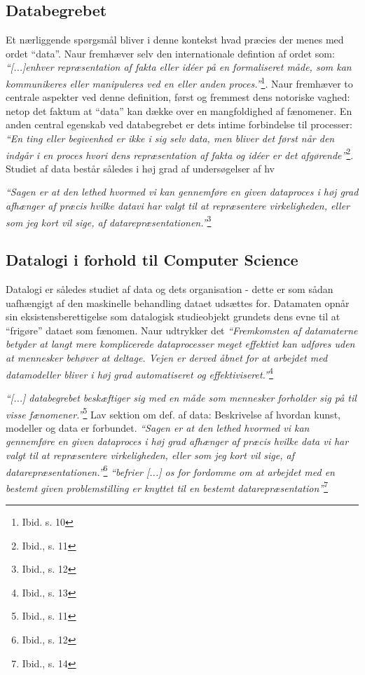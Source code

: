 \documentclass[10pt,a4paper]{article}
\newcommand{\citat}[2]{\vspace{0.1cm}\newline\textit{``#1''}\hspace{0.1cm}\footnote{#2}\vspace{0.1cm}\newline}
\begin{document}
\subsection{Databegrebet}
Et nærliggende spørgsmål bliver i denne kontekst hvad præcies der menes med
ordet ``data''. Naur fremhæver selv den internationale defintion af ordet som:
\citat{[...]enhver repræsentation af fakta eller idéer på en formaliseret måde, som
kan kommunikeres eller manipuleres ved en eller anden proces.}{Ibid. s. 10}.
Naur fremhæver to centrale aspekter ved denne definition, først og fremmest
dens notoriske vaghed: netop det faktum at ``data'' kan dække over en
mangfoldighed af fænomener. En anden central egenskab ved databegrebet er dets 
intime forbindelse til processer: \citat{En ting eller begivenhed er ikke i sig 
selv data, men bliver det først når den indgår i en proces hvori dens repræsentation 
af fakta og idéer er det afgørende}{Ibid., s. 11}. Studiet af data består således i
høj grad af undersøgelser af hv


\citat{Sagen er at den lethed 
hvormed vi kan gennemføre en given dataproces i høj grad afhænger af præcis hvilke
datavi har valgt til at repræsentere virkeligheden, eller som jeg kort vil sige,
af \emph{datarepræsentationen}.}{Ibid., s. 12} 


\subsection{Datalogi i forhold til Computer Science}
Datalogi er således studiet af data og dets organisation - dette er som sådan 
uafhængigt af den maskinelle behandling dataet udsættes for. Datamaten opnår sin 
eksistensberettigelse som datalogisk studieobjekt grundets dens evne til at 
``frigøre'' dataet som fænomen. Naur udtrykker det \citat{Fremkomsten af datamaterne
betyder at langt mere komplicerede dataprocesser meget effektivt kan udføres
uden at mennesker behøver at deltage. Vejen er derved åbnet for at arbejdet
 med datamodeller bliver i høj grad automatiseret og effektiviseret.}{Ibid., s. 13}

\citat{[...] databegrebet
    beskæftiger sig med en måde som mennesker forholder sig på til visse
    fænomener.}{Ibid., s. 11} Lav sektion om def. af data: Beskrivelse af hvordan
kunst, modeller og data er forbundet.  \citat{Sagen er at den lethed hvormed vi
    kan gennemføre en given dataproces i høj grad afhænger af præcis hvilke data
    vi har valgt til at repræsentere virkeligheden, eller som jeg kort vil sige,
    af \emph{datarepræsentationen}.}{Ibid., s. 12} 
\citat{befrier [...] os for fordomme om at arbejdet med en bestemt given
    problemstilling er knyttet til en bestemt datarepræsentation}{Ibid., s. 14}
\end{document}
